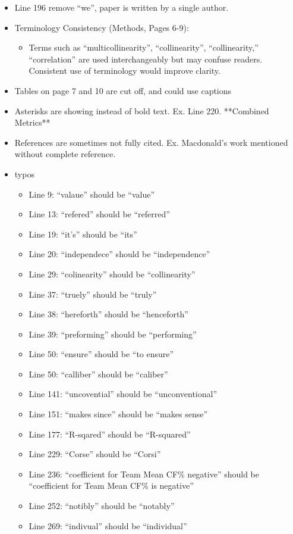 \documentclass[a4paper,9pt]{scrartcl}
\begin{document}
\begin{itemize}
    \item Line 196 remove \enquote{we}, paper is written by a single author. 
    \item Terminology Consistency (Methods, Pages 6-9):
    \begin{itemize}
        \item Terms such as \enquote{multicollinearity}, \enquote{collinearity}, “collinearity,” \enquote{correlation} are used interchangeably but may confuse readers. Consistent use of terminology would improve clarity. 
    \end{itemize}
    \item Tables on page 7 and 10 are cut off, and could use captions
    \item Asterisks are showing instead of bold text. Ex. Line 220. **Combined Metrics** 
    \item References are sometimes not fully cited. Ex. Macdonald’s work mentioned without complete reference. 
    \item typos
    \begin{itemize}
        \item Line 9: \enquote{valaue} should be \enquote{value}
        \item Line 13: \enquote{refered} should be \enquote{referred}
        \item Line 19: \enquote{it’s} should be \enquote{its}
        \item Line 20: \enquote{independece} should be \enquote{independence}
        \item Line 29: \enquote{colinearity} should be \enquote{collinearity}
        \item Line 37: \enquote{truely} should be \enquote{truly}
        \item Line 38: \enquote{hereforth} should be \enquote{henceforth}
        \item Line 39: \enquote{preforming} should be \enquote{performing}
        \item Line 50: \enquote{ensure} should be \enquote{to ensure}
        \item Line 50: \enquote{calliber} should be \enquote{caliber}
        \item Line 141: \enquote{uncovential} should be \enquote{unconventional}
        \item Line 151: \enquote{makes since} should be \enquote{makes sense}
        \item Line 177: \enquote{R-sqared} should be \enquote{R-squared}
        \item Line 229: \enquote{Corse} should be \enquote{Corsi}
        \item Line 236: \enquote{coefficient for Team Mean CF\% negative} should be \enquote{coefficient for Team Mean CF\% is negative}
        \item Line 252: \enquote{notibly} should be \enquote{notably}
        \item Line 269: \enquote{indivual} should be \enquote{individual} 
    \end{itemize}
\end{itemize}
\end{document}

